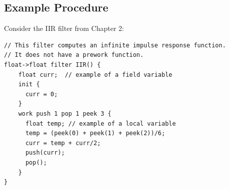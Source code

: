 \subsection{Example Procedure}

    Consider the IIR filter from Chapter 2:

\begin{scriptsize}
\begin{verbatim}
// This filter computes an infinite impulse response function.
// It does not have a prework function.
float->float filter IIR() {
    float curr;  // example of a field variable
    init {
      curr = 0;
    }
    work push 1 pop 1 peek 3 {
      float temp; // example of a local variable
      temp = (peek(0) + peek(1) + peek(2))/6;
      curr = temp + curr/2;
      push(curr);
      pop();
    }
}
\end{verbatim}
\end{scriptsize}

